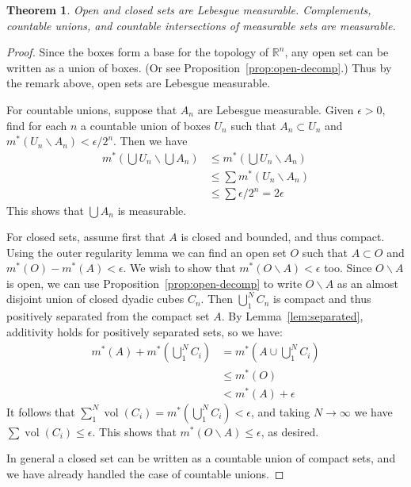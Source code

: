 \documentclass[11pt,oneside]{amsbook}
\renewcommand{\setminus}{\smallsetminus}
\newcommand{\RR}{{\mathbb R}}
\DeclareMathOperator{\vol}{vol}
\theoremstyle{definition}
\theoremstyle{plain}
\newtheorem{thm}{Theorem}[section]
\theoremstyle{definition}
\theoremstyle{remark}
\numberwithin{equation}{section}
\numberwithin{figure}{section}
\begin{document}
\begin{thm}
  Open and closed sets are Lebesgue measurable. Complements, countable unions, and countable intersections of measurable sets are measurable.
\end{thm}

\begin{proof}
  Since the boxes form a base for the topology of $\RR^n$, any open set can be written as a union of boxes. (Or see Proposition~\ref{prop:open-decomp}.) Thus by the remark above, open sets are Lebesgue measurable.

  For countable unions, suppose that $A_n$ are Lebesgue measurable. Given $\epsilon>0$, find for each $n$ a countable union of boxes $U_n$ such that $A_n\subset U_n$ and $m^*(U_n\setminus A_n)<\epsilon/2^n$. Then we have
  \begin{align*}
    m^*(\bigcup U_n\smallsetminus\bigcup A_n)
    &\leq m^*(\bigcup U_n\setminus A_n)\\
    &\leq \sum m^*(U_n\setminus A_n)\\
    &\leq \sum \epsilon/2^n=2\epsilon
  \end{align*}
  This shows that $\bigcup A_n$ is measurable.

  For closed sets, assume first that $A$ is closed and bounded, and thus compact. Using the outer regularity lemma we can find an open set $O$ such that $A\subset O$ and $m^*(O)-m^*(A)<\epsilon$. We wish to show that $m^*(O\setminus A)<\epsilon$ too. Since $O\setminus A$ is open, we can use Proposition~\ref{prop:open-decomp} to write $O\setminus A$ as an almost disjoint union of closed dyadic cubes $C_n$. Then $\bigcup_1^N C_n$ is compact and thus positively separated from the compact set $A$. By Lemma~\ref{lem:separated}, additivity holds for positively separated sets, so we have:
  \begin{align*}
    m^*(A)+m^*(\bigcup_1^N C_i)&=m^*(A\cup\bigcup_1^N C_i)\\
                              &\leq m^*(O)\\
                              &<m^*(A)+\epsilon
  \end{align*}
  It follows that $\sum_1^N\vol(C_i)=m^*(\bigcup_1^NC_i)<\epsilon$, and taking $N\to\infty$ we have $\sum\vol(C_i)\leq\epsilon$. This shows that $m^*(O\setminus A)\leq\epsilon$, as desired.

  In general a closed set can be written as a countable union of compact sets, and we have already handled the case of countable unions.


\end{proof}
\end{document}
